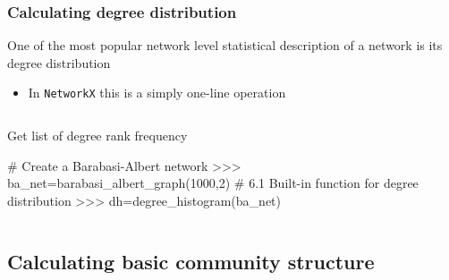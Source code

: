\documentclass[xcolor=dvipsnames, 9pt]{beamer}
\newenvironment{code}{\begin{semiverbatim} \begin{footnotesize}}
{\end{footnotesize}\end{semiverbatim}}
\begin{document}
\begin{frame}[fragile]
    \frametitle{Calculating degree distribution}
    One of the most popular network level statistical description of a network is its degree distribution
    \begin{itemize}
        \item In \texttt{NetworkX} this is a simply one-line operation
    \end{itemize}
    \begin{columns}
         \begin{block}{Get list of degree rank frequency}
                \begin{code}
# Create a Barabasi-Albert network
>>> ba_net=barabasi_albert_graph(1000,2)   
# 6.1 Built-in function for degree distribution
>>> dh=degree_histogram(ba_net)
                \end{code}
         \end{block}
    \end{columns}
\end{frame}



\subsection{Calculating basic community structure} %
\label{sub:calculating_basic_community_structure}
\end{document}
